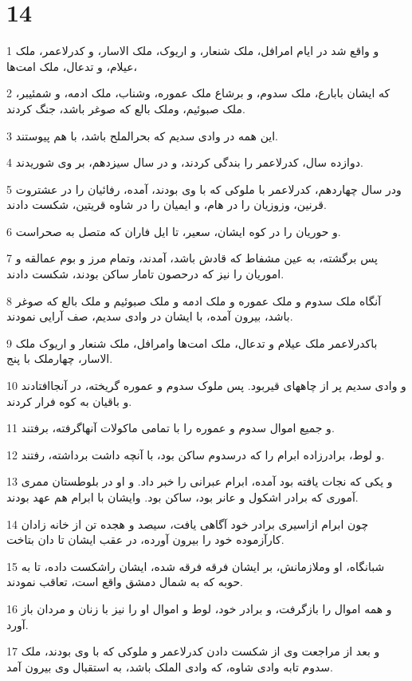 \chapter{14}

\par 1 و واقع شد در ایام امرافل، ملک شنعار، و اریوک، ملک الاسار، و کدرلاعمر، ملک عیلام، و تدعال، ملک امت‌ها،
\par 2 که ایشان بابارع، ملک سدوم، و برشاع ملک عموره، وشناب، ملک ادمه، و شمئیبر، ملک صبوئیم، وملک بالع که صوغر باشد، جنگ کردند.
\par 3 این همه در وادی سدیم که بحرالملح باشد، با هم پیوستند.
\par 4 دوازده سال، کدرلاعمر را بندگی کردند، و در سال سیزدهم، بر وی شوریدند.
\par 5 ودر سال چهاردهم، کدرلاعمر با ملوکی که با وی بودند، آمده، رفائیان را در عشتروت قرنین، وزوزیان را در هام، و ایمیان را در شاوه قریتین، شکست دادند.
\par 6 و حوریان را در کوه ایشان، سعیر، تا ایل فاران که متصل به صحراست.
\par 7 پس برگشته، به عین مشفاط که قادش باشد، آمدند، وتمام مرز و بوم عمالقه و اموریان را نیز که درحصون تامار ساکن بودند، شکست دادند.
\par 8 آنگاه ملک سدوم و ملک عموره و ملک ادمه و ملک صبوئیم و ملک بالع که صوغر باشد، بیرون آمده، با ایشان در وادی سدیم، صف آرایی نمودند.
\par 9 باکدرلاعمر ملک عیلام و تدعال، ملک امت‌ها وامرافل، ملک شنعار و اریوک ملک الاسار، چهارملک با پنج.
\par 10 و وادی سدیم پر از چاههای قیربود. پس ملوک سدوم و عموره گریخته، در آنجاافتادند و باقیان به کوه فرار کردند.
\par 11 و جمیع اموال سدوم و عموره را با تمامی ماکولات آنهاگرفته، برفتند.
\par 12 و لوط، برادرزاده ابرام را که درسدوم ساکن بود، با آنچه داشت برداشته، رفتند.
\par 13 و یکی که نجات یافته بود آمده، ابرام عبرانی را خبر داد. و او در بلوطستان ممری آموری که برادر اشکول و عانر بود، ساکن بود. وایشان با ابرام هم عهد بودند.
\par 14 چون ابرام ازاسیری برادر خود آگاهی یافت، سیصد و هجده تن از خانه زادان کارآزموده خود را بیرون آورده، در عقب ایشان تا دان بتاخت.
\par 15 شبانگاه، او وملازمانش، بر ایشان فرقه فرقه شده، ایشان راشکست داده، تا به حوبه که به شمال دمشق واقع است، تعاقب نمودند.
\par 16 و همه اموال را بازگرفت، و برادر خود، لوط و اموال او را نیز با زنان و مردان باز آورد.
\par 17 و بعد از مراجعت وی از شکست دادن کدرلاعمر و ملوکی که با وی بودند، ملک سدوم تابه وادی شاوه، که وادی الملک باشد، به استقبال وی بیرون آمد.
